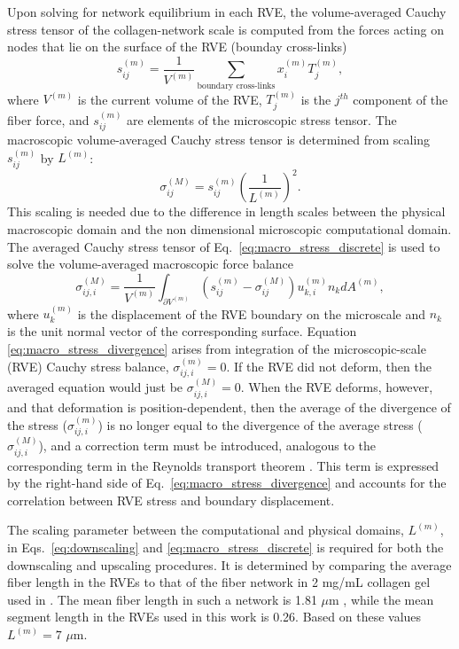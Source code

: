 \documentclass[]{interact}
\begin{document}
Upon solving for network equilibrium in each RVE, the volume-averaged Cauchy stress tensor of the collagen-network scale is computed from the forces acting on nodes that lie on the surface of the RVE (bounday cross-links) \citep{Chandran:2007hy}
%
\begin{equation}
s_{ij}^{(m)} = \frac{1}{V^{(m)}} \sum_{\text{boundary cross-links}} x_i^{(m)} T_j^{(m)} ,
\label{eq:micro_stress_discrete}
\end{equation}
%
where $V^{(m)}$ is the current volume of the RVE, $T_j^{(m)}$ is the $j^{th}$ component of the fiber force, and $s_{ij}^{(m)}$ are elements of the microscopic stress tensor. The macroscopic volume-averaged Cauchy stress tensor is determined from scaling $s_{ij}^{(m)}$ by  $L^{(m)}$:
%
\begin{equation}
\sigma_{ij}^{(M)} = s_{ij}^{(m)}\left(\frac{1}{L^{(m)}}\right)^2.
\label{eq:macro_stress_discrete}
\end{equation}
%
This scaling is needed due to the difference in length scales between the physical macroscopic domain and the non dimensional microscopic computational domain. The averaged Cauchy stress tensor of Eq.\ \eqref{eq:macro_stress_discrete} is used to solve the volume-averaged macroscopic force balance \citep{Chandran:2007hy}
%
\begin{equation}
\sigma_{ij,i}^{(M)} = \frac{1}{V^{(m)}} \int_{\partial V^{(m)}} \left( s_{ij}^{(m)} - \sigma_{ij}^{(M)} \right)u_{k,i}^{(m)} n_k dA^{(m)},
\label{eq:macro_stress_divergence}
\end{equation}
%
where $u_k^{(m)}$ is the displacement of the RVE boundary on the microscale and $n_k$ is the unit normal vector of the corresponding surface. Equation \eqref{eq:macro_stress_divergence} arises from integration of the microscopic-scale (RVE) Cauchy stress balance, $\sigma_{ij,i}^{(m)} = 0$. If the RVE did not deform, then the averaged equation would just be $\sigma^{(M)}_{ij,i}=0$. When the RVE deforms, however, and that deformation is position-dependent, then the average of the divergence of the stress ($\sigma_{ij,i}^{(m)}$) is no longer equal to the divergence of the average stress ($\sigma_{ij,i}^{(M)}$), and a correction term must be introduced, analogous to the corresponding term in the Reynolds transport theorem \citep{Whitaker-1999}. This term is expressed by the right-hand side of Eq.\ \eqref{eq:macro_stress_divergence} and accounts for the correlation between RVE stress and boundary displacement.

The scaling parameter between the computational and physical domains, $L^{(m)}$, in Eqs.\ \eqref{eq:downscaling} and \eqref{eq:macro_stress_discrete} is required for both the downscaling and upscaling procedures. It is determined by comparing the average fiber length in the RVEs to that of the fiber network in 2 mg/mL collagen gel used in \citep{Zhang:2016ga}. The mean fiber length in such a network is 1.81 $\mu$m \citep{Lindstrom:2013gd}, while the mean segment length in the RVEs used in this work is 0.26. Based on these values $L^{(m)} = 7$ $\mu$m.
\end{document}
